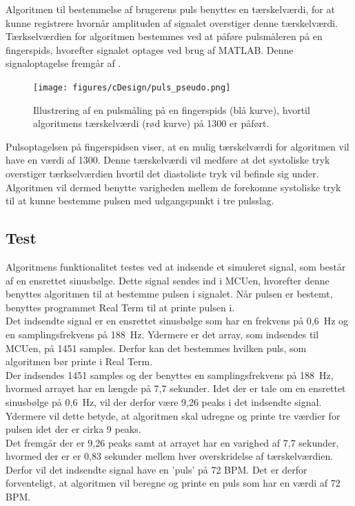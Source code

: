 Algoritmen til bestemmelse af brugerens puls benyttes en tærskelværdi, for at kunne registrere hvornår amplituden af signalet overstiger denne tærskelværdi. Tærkselværdien for algoritmen bestemmes ved at påføre pulsmåleren på en fingerspids, hvorefter signalet optages ved brug af MATLAB. Denne signaloptagelse fremgår af .

\begin{figure}[H]
	\centering
	\texttt{[image: figures/cDesign/puls\_pseudo.png]}
	\caption{Illustrering af en pulsmåling på en fingerspids (blå kurve), hvortil algoritmens tærskelværdi (rød kurve) på 1300 er påført.}
	\label{fig:taerskel_puls}
\end{figure}

Pulsoptagelsen på fingerspidsen viser, at en mulig tærskelværdi for algoritmen vil have en værdi af 1300. Denne tærskelværdi vil medføre at det systoliske tryk overstiger tærkselværdien hvortil det diastoliste tryk vil befinde sig under. Algoritmen vil dermed benytte varigheden mellem de forekomne systoliske tryk til at kunne bestemme pulsen med udgangspunkt i tre pulsslag. 


\subsection{Test}
Algoritmens funktionalitet testes ved at indsende et simuleret signal, som består af en ensrettet sinusbølge. Dette signal sendes ind i MCUen, hvorefter denne benyttes algoritmen til at bestemme pulsen i signalet. Når pulsen er bestemt, benyttes programmet Real Term til at printe pulsen i. \\
Det indsendte signal er en ensrettet sinusbølge som har en frekvens på 0,6~Hz og en samplingsfrekvens på 188~Hz. Ydermere er det array, som indsendes til MCUen, på 1451 samples. Derfor kan det bestemmes hvilken puls, som algoritmen bør printe i Real Term. \\
Der indsendes 1451 samples og der benyttes en samplingsfrekvens på 188~Hz, hvormed arrayet har en længde på 7,7 sekunder. Idet der er tale om en ensrettet sinusbølge på 0,6~Hz, vil der derfor være 9,26 peaks i det indsendte signal. Ydermere vil dette betyde, at algoritmen skal udregne og printe tre værdier for pulsen idet der er cirka 9 peaks. \\
Det fremgår der er 9,26 peaks samt at arrayet har en varighed af 7,7 sekunder, hvormed der er er 0,83 sekunder mellem hver overskridelse af tærskelværdien. Derfor vil det indsendte signal have en 'puls' på 72 BPM. Det er derfor forventeligt, at algoritmen vil beregne og printe en puls som har en værdi af 72 BPM. 

